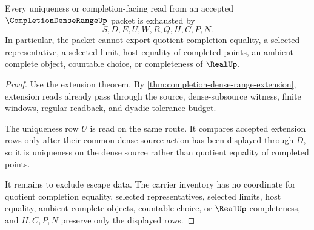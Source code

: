 \begin{theorem}\label{thm:completion-dense-range-nonescape}
Every uniqueness or completion-facing read from an accepted $\CompletionDenseRangeUp$ packet is exhausted by
$$
S,D,E,U,W,R,Q,H,C,P,N .
$$
In particular, the packet cannot export quotient completion equality, a selected representative, a selected limit, host equality of completed points, an ambient complete object, countable choice, or completeness of $\RealUp$.
\end{theorem}
\begin{proof}
Use the extension theorem. By \autoref{thm:completion-dense-range-extension}, extension reads already pass through the source, dense-subsource witness, finite windows, regular readback, and dyadic tolerance budget.

The uniqueness row $U$ is read on the same route. It compares accepted extension rows only after their common dense-source action has been displayed through $D$, so it is uniqueness on the dense source rather than quotient equality of completed points.

It remains to exclude escape data. The carrier inventory has no coordinate for quotient completion equality, selected representatives, selected limits, host equality, ambient complete objects, countable choice, or $\RealUp$ completeness, and $H,C,P,N$ preserve only the displayed rows.
\end{proof}




